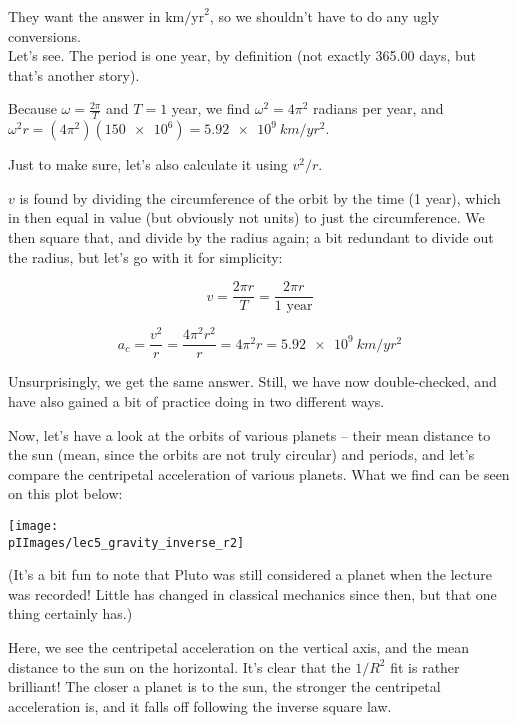 They want the answer in $\text{km/yr}^2$, so we shouldn't have to do any ugly conversions.\\
Let's see. The period is one year, by definition (not exactly 365.00 days, but that's another story).

Because $\omega = \frac{2\pi}{T}$ and $T = 1$ year, we find $\omega^2 = 4\pi^2$ radians per year, and $\omega^2 r = (4 \pi^2)(\num{150e6}) = \SI{5.92e9}{km/yr^2}$.

Just to make sure, let's also calculate it using $v^2/r$.

$v$ is found by dividing the circumference of the orbit by the time (1 year), which in then equal in value (but obviously not units) to just the circumference. We then square that, and divide by the radius again; a bit redundant to divide out the radius, but let's go with it for simplicity:

\begin{equation}
v = \frac{2 \pi r}{T} = \frac{2 \pi r}{1 \text{ year}}
\end{equation}

\begin{equation}
a_c = \frac{v^2}{r} = \frac{4 \pi^2 r^2}{r} = 4 \pi^2 r = \SI{5.92e9}{km/yr^2}
\end{equation}

Unsurprisingly, we get the same answer. Still, we have now double-checked, and have also gained a bit of practice doing in two different ways.

Now, let's have a look at the orbits of various planets -- their mean distance to the sun (mean, since the orbits are not truly circular) and periods, and let's compare the centripetal acceleration of various planets. What we find can be seen on this plot below:

\begin{center}
\texttt{[image: \\pIImages/lec5\_gravity\_inverse\_r2]}
\end{center}

(It's a bit fun to note that Pluto was still considered a planet when the lecture was recorded! Little has changed in classical mechanics since then, but that one thing certainly has.)

Here, we see the centripetal acceleration on the vertical axis, and the mean distance to the sun on the horizontal. It's clear that the $1/R^2$ fit is rather brilliant! The closer a planet is to the sun, the stronger the centripetal acceleration is, and it falls off following the inverse square law.

